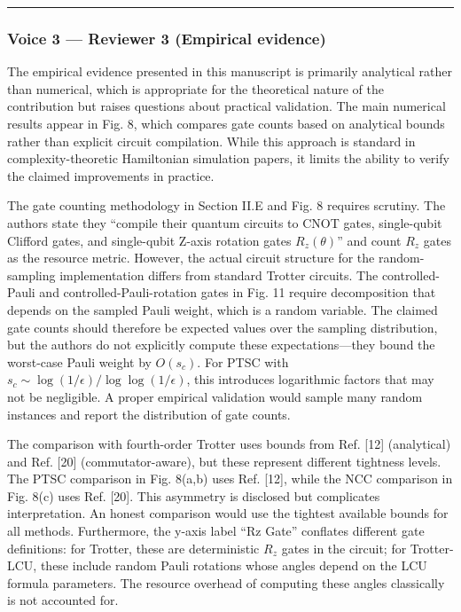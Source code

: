 \documentclass[10pt,letterpaper]{article}
\begin{document}
\begin{center}\rule{0.5\linewidth}{0.5pt}\end{center}

\hypertarget{voice-3-reviewer-3-empirical-evidence}{%
\subsubsection{Voice 3 --- Reviewer 3 (Empirical evidence)}\label{voice-3-reviewer-3-empirical-evidence}}

The empirical evidence presented in this manuscript is primarily analytical rather than numerical, which is appropriate for the theoretical nature of the contribution but raises questions about practical validation. The main numerical results appear in Fig. 8, which compares gate counts based on analytical bounds rather than explicit circuit compilation. While this approach is standard in complexity-theoretic Hamiltonian simulation papers, it limits the ability to verify the claimed improvements in practice.

The gate counting methodology in Section II.E and Fig. 8 requires scrutiny. The authors state they ``compile their quantum circuits to CNOT gates, single-qubit Clifford gates, and single-qubit Z-axis rotation gates \(R_z(\theta)\)'' and count \(R_z\) gates as the resource metric. However, the actual circuit structure for the random-sampling implementation differs from standard Trotter circuits. The controlled-Pauli and controlled-Pauli-rotation gates in Fig. 11 require decomposition that depends on the sampled Pauli weight, which is a random variable. The claimed gate counts should therefore be expected values over the sampling distribution, but the authors do not explicitly compute these expectations---they bound the worst-case Pauli weight by \(O(s_c)\). For PTSC with \(s_c \sim \log(1/\epsilon)/\log\log(1/\epsilon)\), this introduces logarithmic factors that may not be negligible. A proper empirical validation would sample many random instances and report the distribution of gate counts.

The comparison with fourth-order Trotter uses bounds from Ref. {[}12{]} (analytical) and Ref. {[}20{]} (commutator-aware), but these represent different tightness levels. The PTSC comparison in Fig. 8(a,b) uses Ref. {[}12{]}, while the NCC comparison in Fig. 8(c) uses Ref. {[}20{]}. This asymmetry is disclosed but complicates interpretation. An honest comparison would use the tightest available bounds for all methods. Furthermore, the y-axis label ``Rz Gate'' conflates different gate definitions: for Trotter, these are deterministic \(R_z\) gates in the circuit; for Trotter-LCU, these include random Pauli rotations whose angles depend on the LCU formula parameters. The resource overhead of computing these angles classically is not accounted for.
\end{document}
